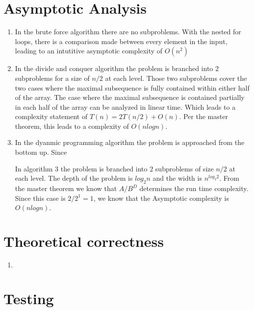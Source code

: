 \documentclass[12pt]{article}
\begin{document}
\section*{Asymptotic Analysis}
    \begin{enumerate}

    \item In the brute force algorithm there are no subproblems.  With the
            nested for loops, there is a comparison made between every element
            in the input, leading to an intutitive asymptotic complexity of 
            $O(n^2)$

	\item In the divide and conquer algorithm the problem is branched into 
            $2$ subproblems for a size of $n/2$ at each level.  Those two
            subproblems cover the two cases where the maximal subsequence
            is fully contained within either half of the array.  The case
            where the maximal subsequence is contained partially in each
            half of the array can be analyzed in linear time.  Which leads
            to a complexity statement of $T(n) = 2T(n/2) + O(n)$.  Per the
            master theorem, this leads to a complexity of $O(n log n)$.

    \item In the dyanmic programming algorithm the problem is approached 
            from the bottom up. Since 
             
            In algorithm 3 the problem is branched into $2$ subproblems of size
          $n/2$ at each level.  The depth of the problem is $log_2 n$
          and the width is $n^{log_2 2}$.  From the master theorem we know
          that $A/B^D$ determines the run time complexity.  Since this
          case is $2/2^1 = 1$, we know that the Asymptotic complexity is
          $O(n log n)$.

    \end{enumerate}

\section*{Theoretical correctness}
    \begin{enumerate}

    \item 

    \end{enumerate}

\section*{Testing}
\end{document}
